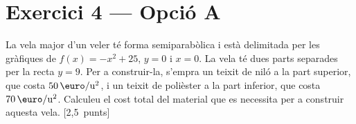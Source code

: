 \documentclass[11pt,a4paper]{article}
\begin{document}
\section*{\textcolor{blauPista}{Exercici 4 --- Opció A}}

\noindent La vela major d'un veler té forma semiparabòlica i està delimitada per les gràfiques de $f(x) = -x^{2} + 25$, $y = 0$ i $x = 0$. La vela té dues parts separades per la recta $y = 9$. Per a construir-la, s'empra un teixit de niló a la part superior, que costa $50\,\text{\euro}/\text{u}^{2}$, i un teixit de polièster a la part inferior, que costa $70\,\text{\euro}/\text{u}^{2}$. Calculeu el cost total del material que es necessita per a construir aquesta vela. \hfill\textnormal{[2,5~punts]}


\vspace{0.6em}
\end{document}
